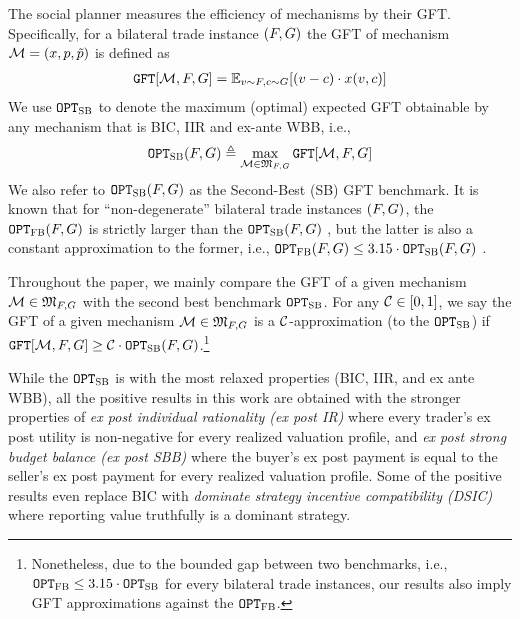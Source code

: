 The social planner measures the efficiency of mechanisms by their GFT. Specifically, for a bilateral trade instance $(F,G)$ the GFT of mechanism $\mathcal{M} = (x,p, \tilde{p})$ is defined as 
\begin{align*}
    \GFT{\mech,\buyerdist,\sellerdist} = \expect[\val\sim\buyerdist,\cost\sim\sellerdist]{(\val - \cost)\cdot \alloc(\val,\cost)}
\end{align*}
We use $\texttt{OPT}_{\textsc{SB}}$ to denote the maximum (optimal) expected GFT obtainable by any mechanism that is BIC, IIR and ex-ante WBB, i.e.,
\begin{align*}
    \OPTSB\btinstance \triangleq \max_{{\mech\in\mechfamily}}
    \GFT{\mech,\buyerdist,\sellerdist}
\end{align*} 
We also refer to $\texttt{OPT}_{\textsc{SB}}(F,G)$ as the {\sf Second-Best (SB) GFT benchmark}. It is known that for ``non-degenerate'' bilateral trade instances $(F,G)$, the {\FirstBest} $\texttt{OPT}_{\textsc{FB}}(F,G)$ is strictly larger than the {{\SecondBest}} $\texttt{OPT}_{\textsc{SB}}(F,G)$ \citep{MS-83}, but the latter is also a constant approximation to the former, i.e., $\texttt{OPT}_{\textsc{FB}}(F,G) \leq 3.15 \cdot \texttt{OPT}_{\textsc{SB}}(F,G)$ \citep{DMSW-22,Fei-22}. 

Throughout the paper, we mainly compare the GFT of a given mechanism $\mathcal{M}\in\mathfrak{M}_{F,G}$ with the second best benchmark $\texttt{OPT}_{\textsc{SB}}$. For any $\mathcal{C}\in[0, 1]$, we say the GFT of a given mechanism ${\mathcal{M}\in\mathfrak{M}_{F,G}}$ is a $\mathcal{C}$-approximation (to the {{\SecondBest}} $\texttt{OPT}_{\textsc{SB}}$) if $\GFT{\mech,\buyerdist,\sellerdist} \geq \GFTapprox \cdot \OPTSB\btinstance$.\footnote{Nonetheless, due to the bounded gap between two benchmarks, i.e., $\texttt{OPT}_{\textsc{FB}}\leq 3.15 \cdot \texttt{OPT}_{\textsc{SB}}$ for every bilateral trade instances, our results also imply GFT approximations against the {\FirstBest} $\texttt{OPT}_{\textsc{FB}}$.}


While the {\SecondBest} $\texttt{OPT}_{\textsc{SB}}$ is with the most relaxed properties (BIC, IIR, and ex ante WBB), all the positive results in this work are obtained with the stronger properties of \emph{ex post individual rationality (ex post IR)} where every trader's ex post utility is non-negative for every realized valuation profile, and \emph{ex post strong budget balance (ex post SBB)} where the buyer's ex post payment is equal to the seller's ex post payment for every realized valuation profile. Some of the positive results even replace BIC with \emph{dominate strategy incentive compatibility (DSIC)} where reporting value truthfully is a dominant strategy. 



